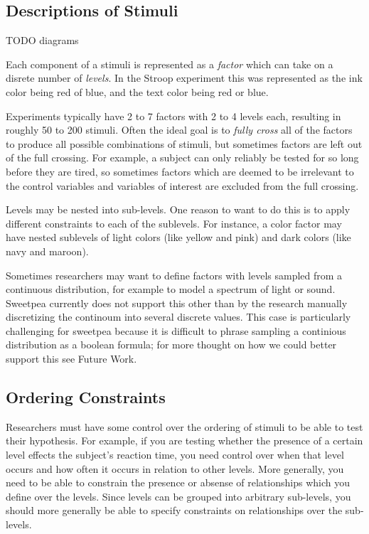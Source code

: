 \subsection{Descriptions of Stimuli}

TODO diagrams

Each component of a stimuli is represented as a \emph{factor} which can take on a disrete number of \emph{levels}. In the Stroop experiment this was represented as the ink color being red of blue, and the text color being red or blue.

Experiments typically have 2 to 7 factors with 2 to 4 levels each, resulting in roughly 50 to 200 stimuli. Often the ideal goal is to \emph{fully cross} all of the factors to produce all possible combinations of stimuli, but sometimes factors are left out of the full crossing. For example, a subject can only reliably be tested for so long before they are tired, so sometimes factors which are deemed to be irrelevant to the control variables and variables of interest are excluded from the full crossing.

Levels may be nested into sub-levels. One reason to want to do this is to apply different constraints to each of the sublevels. For instance, a color factor may have nested sublevels of light colors (like yellow and pink) and dark colors (like navy and maroon).

Sometimes researchers may want to define factors with levels sampled from a continuous distribution, for example to model a spectrum of light or sound. Sweetpea currently does not support this other than by the research manually discretizing the continoum into several discrete values. This case is particularly challenging for sweetpea because it is difficult to phrase sampling a continious distribution as a boolean formula; for more thought on how we could better support this see Future Work.

\subsection{Ordering Constraints}

Researchers must have some control over the ordering of stimuli to be able to test their hypothesis. For example, if you are testing whether the presence of a certain level effects the subject's reaction time, you need control over when that level occurs and how often it occurs in relation to other levels. More generally, you need to be able to constrain the presence or absense of relationships which you define over the levels. Since levels can be grouped into arbitrary sub-levels, you should more generally be able to specify constraints on relationships over the sub-levels.

